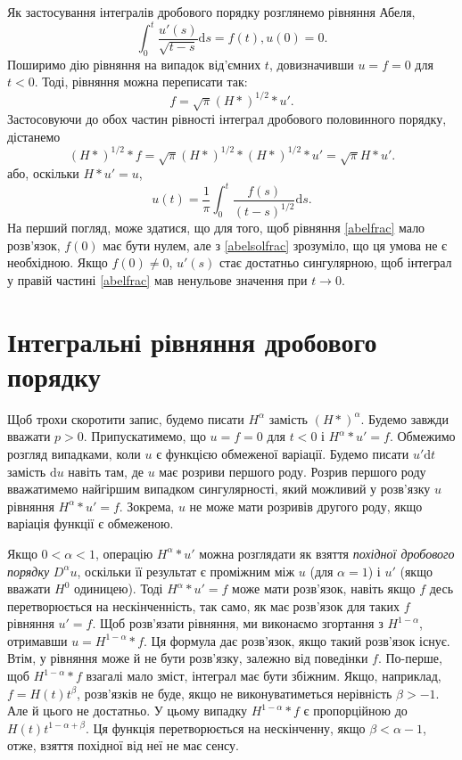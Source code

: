 \documentclass[14pt,twoside]{extreport}
\theoremstyle{mystyle}
\numberwithin{equation}{chapter}
\begin{document}
Як застосування інтегралів дробового порядку розглянемо рівняння Абеля,
\begin{equation}\label{abelfrac}
\displaystyle \int_{0}^{t}\frac{u'(s)}{\sqrt{t-s}}\mathrm{d}s=f(t) , u(0)=0.
\end{equation}
Поширимо дію рівняння на випадок від'ємних $t$, довизначивши $u=f=0$ для $t<0$. Тоді, рівняння можна переписати так:
\begin{equation}
f=\sqrt{\pi}(H*)^{1/2}*u'.
\end{equation}
Застосовуючи до обох частин рівності інтеграл дробового половинного порядку, дістанемо
\begin{equation}
(H*)^{1/2}*f=\sqrt{\pi}(H*)^{1/2}*(H*)^{1/2}*u'=\sqrt{\pi}H*u'.
\end{equation}
або, оскільки $H*u'=u$,
\begin{equation}\label{abelsolfrac}
u(t)=\dfrac{1}{\pi}\int_{0}^{t}\dfrac{f(s)}{(t-s)^{1/2}}\mathrm{d}s.
\end{equation}
На перший погляд, може здатися, що для того, щоб рівняння \eqref{abelfrac} мало розв'язок, $f(0)$ має бути нулем, але з \eqref{abelsolfrac} зрозуміло, що ця умова не є необхідною. Якщо $f(0)\neq 0$, $u'(s)$ стає достатньо сингулярною, щоб інтеграл у правій частині \eqref{abelfrac} мав ненульове значення при $t\to 0$.

\section{Інтегральні рівняння дробового порядку}

Щоб трохи скоротити запис, будемо писати $H^{\alpha}$ замість $(H*)^{\alpha}$. Будемо завжди вважати $p>0$. Припускатимемо, що $u=f=0$ для $t<0$ і $H^{\alpha}*u'=f$. Обмежимо розгляд випадками, коли $u$ є функцією обмеженої варіації. Будемо писати $u'\mathrm{d}t$ замість $\mathrm{d}u$ навіть там, де $u$ має розриви першого роду. Розрив першого роду вважатимемо найгіршим випадком сингулярності, який можливий у розв'язку $u$ рівняння $H^{\alpha}*u'=f$. Зокрема, $u$ не може мати розривів другого роду, якщо варіація функції є обмеженою.

Якщо $0<\alpha<1$, операцію $H^{\alpha}*u'$ можна розглядати як взяття \emph{похідної дробового порядку} $D^{\alpha}u$, оскільки її результат є проміжним між $u$ (для $\alpha=1$) і $u'$ (якщо вважати $H^{0}$ одиницею). Тоді $H^{\alpha}*u'=f$ може мати розв'язок, навіть якщо $f$ десь перетворюється на нескінченність, так само, як має розв'язок для таких $f$ рівняння $u'=f$. Щоб розв'язати рівняння, ми виконаємо згортання з $H^{1-\alpha}$, отримавши $u=H^{1-\alpha}*f$. Ця формула дає розв'язок, якщо такий розв'язок існує. Втім, у рівняння може й не бути розв'язку, залежно від поведінки $f$. По-перше, щоб $H^{1-\alpha}*f$ взагалі мало зміст, інтеграл має бути збіжним. Якщо, наприклад, $f=H(t)t^{\beta}$, розв'язків не буде, якщо не виконуватиметься нерівність $\beta>-1$. Але й цього не достатньо. У цьому випадку $H^{1-\alpha}*f$ є пропорційною до  $H(t)t^{1-\alpha+\beta}$. Ця функція перетворюється на нескінченну, якщо $\beta<\alpha-1$, отже, взяття похідної від неї не має сенсу.
\end{document}
